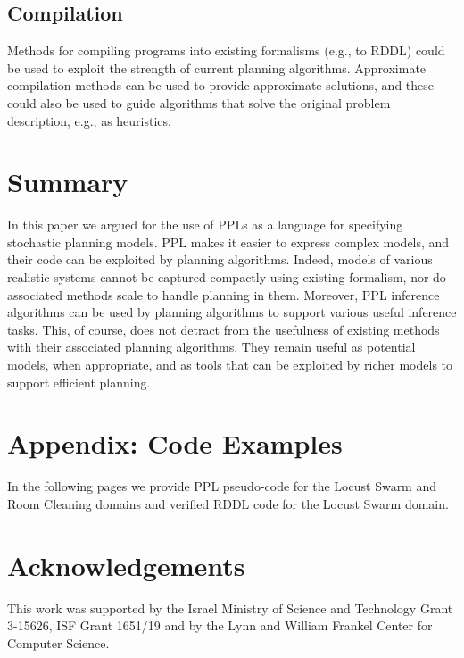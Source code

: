 \documentclass[letterpaper]{article} %
\theoremstyle{definition}
\begin{document}
\subsection{Compilation}
Methods for compiling programs into existing formalisms (e.g., to RDDL) could be used to exploit the strength of current planning algorithms.
Approximate compilation methods can be used to provide
approximate solutions, and these could also be used to guide algorithms that solve the original problem description, e.g., as heuristics.

\section{Summary}
In this paper we argued for the use of PPLs as a language for specifying stochastic planning models. PPL makes it easier to express complex models, and their code can be exploited by planning algorithms. Indeed, models of various realistic systems cannot be captured compactly using existing formalism,
nor do associated methods scale to handle planning in them.
Moreover, PPL inference algorithms can be used by planning algorithms to support various useful inference tasks. This, of course, does not detract from the usefulness of existing methods with their associated planning algorithms. They remain useful as potential models, when appropriate, and as tools that can be exploited by richer models to support efficient
planning.


%
\section{Appendix: Code Examples}
In the following pages we provide PPL pseudo-code for the Locust Swarm and
Room Cleaning domains and verified RDDL code for the Locust Swarm domain.
\onecolumn


\bigskip
\bigskip


\twocolumn
\section{Acknowledgements}
This work was supported by the Israel Ministry of Science and Technology Grant 3-15626, ISF Grant
1651/19 and by the Lynn and William Frankel Center for Computer Science.
\clearpage

\end{document}
